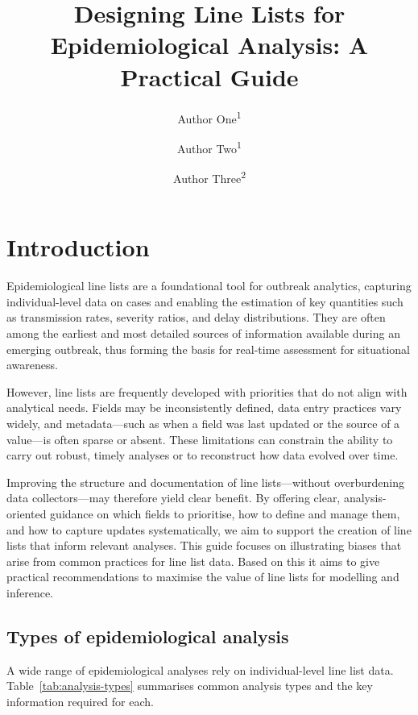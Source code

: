 \documentclass[11pt,a4paper]{article}
\title{Designing Line Lists for Epidemiological Analysis: A Practical Guide}
\author{
  Author One\textsuperscript{1} \and
  Author Two\textsuperscript{1} \and
  Author Three\textsuperscript{2}
}
\date{}
\begin{document}
\maketitle

\begin{abstract}
\end{abstract}

\section{Introduction}

Epidemiological line lists are a foundational tool for outbreak analytics, capturing individual-level data on cases and enabling the estimation of key quantities such as transmission rates, severity ratios, and delay distributions.
They are often among the earliest and most detailed sources of information available during an emerging outbreak, thus forming the basis for real-time assessment for situational awareness.

However, line lists are frequently developed with priorities that do not align with analytical needs.
Fields may be inconsistently defined, data entry practices vary widely, and metadata---such as when a field was last updated or the source of a value---is often sparse or absent.
These limitations can constrain the ability to carry out robust, timely analyses or to reconstruct how data evolved over time.

Improving the structure and documentation of line lists---without overburdening data collectors---may therefore yield clear benefit.
By offering clear, analysis-oriented guidance on which fields to prioritise, how to define and manage them, and how to capture updates systematically, we aim to support the creation of line lists that inform relevant analyses.
This guide focuses on illustrating biases that arise from common practices for line list data.
Based on this it aims to give practical recommendations to maximise the value of line lists for modelling and inference.

\subsection{Types of epidemiological analysis}

A wide range of epidemiological analyses rely on individual-level line list data.
Table~\ref{tab:analysis-types} summarises common analysis types and the key information required for each.
\end{document}
